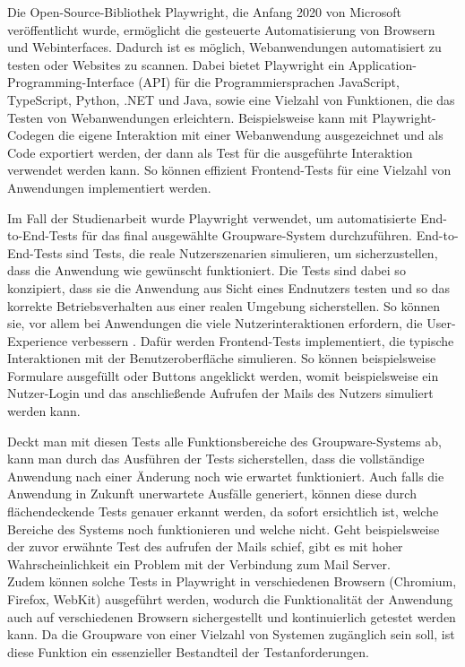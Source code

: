 Die Open-Source-Bibliothek Playwright, die Anfang 2020 von Microsoft veröffentlicht wurde, ermöglicht die gesteuerte Automatisierung von Browsern und Webinterfaces. Dadurch ist es möglich, Webanwendungen automatisiert zu testen oder Websites zu scannen.
Dabei bietet Playwright ein Application-Programming-Interface (API) für die Programmiersprachen JavaScript, TypeScript, Python, .NET und Java, sowie eine Vielzahl von Funktionen, die das Testen von Webanwendungen erleichtern.
Beispielsweise kann mit Playwright-Codegen die eigene Interaktion mit einer Webanwendung ausgezeichnet und als Code exportiert werden, der dann als Test für die ausgeführte Interaktion verwendet werden kann.
So können effizient Frontend-Tests für eine Vielzahl von Anwendungen implementiert werden.
\autocite[Quelle:][]{playwright}

Im Fall der Studienarbeit wurde Playwright verwendet, um automatisierte End-to-End-Tests für das final ausgewählte Groupware-System durchzuführen.
End-to-End-Tests sind Tests, die reale Nutzerszenarien simulieren, um sicherzustellen, dass die Anwendung wie gewünscht funktioniert.
Die Tests sind dabei so konzipiert, dass sie die Anwendung aus Sicht eines Endnutzers testen und so das korrekte Betriebsverhalten aus einer realen Umgebung sicherstellen.
So können sie, vor allem bei Anwendungen die viele Nutzerinteraktionen erfordern, die User-Experience verbessern \autocite[vgl.][]{e2e-blog}.
Dafür werden Frontend-Tests implementiert, die typische Interaktionen mit der Benutzeroberfläche simulieren.
So können beispielsweise Formulare ausgefüllt oder Buttons angeklickt werden, womit beispielsweise ein Nutzer-Login und das anschließende Aufrufen der Mails des Nutzers simuliert werden kann.

Deckt man mit diesen Tests alle Funktionsbereiche des Groupware-Systems ab, kann man durch das Ausführen der Tests sicherstellen, dass die vollständige Anwendung nach einer Änderung noch wie erwartet funktioniert.
Auch falls die Anwendung in Zukunft unerwartete Ausfälle generiert, können diese durch flächendeckende Tests genauer erkannt werden, da sofort ersichtlich ist, welche Bereiche des Systems noch funktionieren und welche nicht.
Geht beispielsweise der zuvor erwähnte Test des aufrufen der Mails schief, gibt es mit hoher Wahrscheinlichkeit ein Problem mit der Verbindung zum Mail Server.
\\
Zudem können solche Tests in Playwright in verschiedenen Browsern (Chromium, Firefox, WebKit) ausgeführt werden, wodurch die Funktionalität der Anwendung auch auf verschiedenen Browsern sichergestellt und kontinuierlich getestet werden kann.
Da die Groupware von einer Vielzahl von Systemen zugänglich sein soll, ist diese Funktion ein essenzieller Bestandteil der Testanforderungen.








